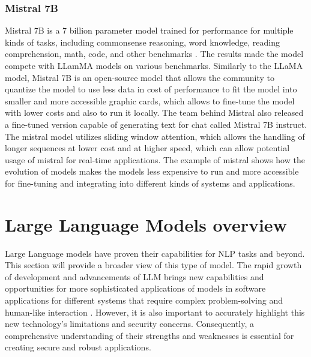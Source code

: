 







\subsubsection{Mistral 7B}

Mistral 7B is a 7 billion parameter model trained for performance for multiple kinds of tasks, including commonsense reasoning, word knowledge, reading comprehension, math, code, and other benchmarks \cite{jiang2023mistral}. The results made the model compete with LLamMA models on various benchmarks. Similarly to the LLaMA model, Mistral 7B is an open-source model that allows the community to quantize the model to use less data in cost of performance to fit the model into smaller and more accessible graphic cards, which allows to fine-tune the model with lower costs and also to run it locally. The team behind Mistral also released a fine-tuned version capable of generating text for chat called Mistral 7B instruct. The mistral model utilizes sliding window attention, which allows the handling of longer sequences at lower cost and at higher speed, which can allow potential usage of mistral for real-time applications. The example of mistral shows how the evolution of models makes the models less expensive to run and more accessible for fine-tuning and integrating into different kinds of systems and applications. 


\section{Large Language Models overview}

Large Language models have proven their capabilities for NLP tasks and beyond. This section will provide a broader view of this type of model. The rapid growth of development and advancements of LLM brings new capabilities and opportunities for more sophisticated applications of models in software applications for different systems that require complex problem-solving and human-like interaction \cite{naveed2023comprehensive}. However, it is also important to accurately highlight this new technology's limitations and security concerns. Consequently, a comprehensive understanding of their strengths and weaknesses is essential for creating secure and robust applications. 

